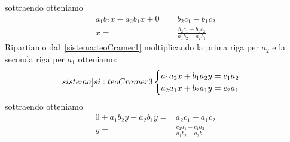 sottraendo otteniamo
\begin{align*}
a_1b_2x-a_2b_1x+0=&b_2c_1-b_1c_2\\
x=&\frac{b_2c_1-b_1c_2}{a_1b_2-a_2b_1}
\end{align*}
Ripartiamo dal~\cref{sistema:teoCramer1} moltiplicando la prima riga per $a_2$ e la seconda riga per $a_1$ otteniamo:
\begin{equation}\label[sistema]{si:teoCramer3}
\begin{cases}
a_1a_2x+b_1a_2y=c_1a_2\\
a_2a_1x+b_2a_1y=c_2a_1
\end{cases}
\end{equation}
sottraendo otteniamo
\begin{align*}
0+a_1b_2y-a_2b_1y=&a_2c_1-a_1c_2\\
y=&\frac{c_2a_1-c_1a_2}{a_1b_2-a_2b_1}
\end{align*}